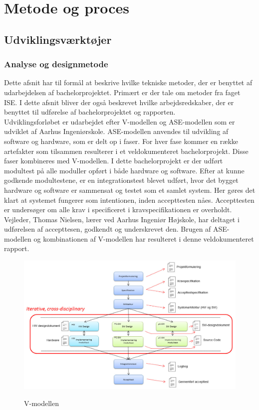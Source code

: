 \chapter{Metode og proces}

\section{Udviklingsværktøjer}

\subsection{Analyse og designmetode}

Dette afsnit har til formål at beskrive hvilke tekniske metoder, der er benyttet af udarbejdelsen af bachelorprojektet. Primært er der tale om metoder fra faget ISE. I dette afsnit bliver der også beskrevet hvilke arbejdsredskaber, der er benyttet til udførelse af bachelorprojektet og rapporten.\\

Udviklingsforløbet er udarbejdet efter V-modellen og ASE-modellen \cite{IngeniorhojskolenAarhusUniversiteta} som er udviklet af Aarhus Ingeniørskole. ASE-modellen anvendes til udvikling af software og hardware, som er delt op i faser. For hver fase kommer en række artefakter som tilsammen resulterer i et veldokumenteret bachelorprojekt. Disse faser kombineres med V-modellen. I dette bachelorprojekt er der udført modultest på alle moduller opført i både hardware og software. Efter at kunne godkende modultestene, er en integrationstest blevet udført, hvor det bygget hardware og software er sammensat og testet som et samlet system. Her gøres det klart at systemet fungerer som intentionen, inden accepttesten nåes. Accepttesten er undersøger om alle krav i specificeret i kravspecifikationen er overholdt. Vejleder, Thomas Nielsen, lærer ved Aarhus Ingeniør Højskole, har deltaget i udførelsen af accepttesen, godkendt og underskrevet den. 
Brugen af ASE-modellen og kombinationen af V-modellen har resulteret i denne veldokumenteret rapport.   

\begin{figure}[H]
\centering
{\includegraphics[width=\textwidth]
{Figure/asemodel}}
\caption{V-modellen}
\label{asemodel}
\end{figure}


